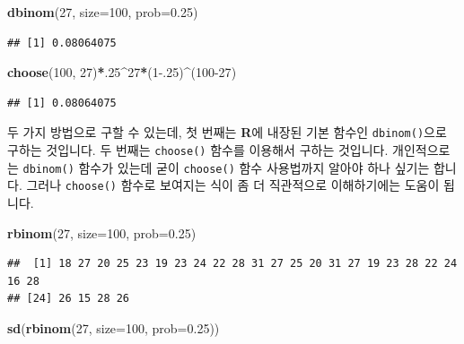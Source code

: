 \documentclass[]{book}
\newenvironment{Shaded}{\begin{snugshade}}{\end{snugshade}}
\newcommand{\DataTypeTok}[1]{\textcolor[rgb]{0.13,0.29,0.53}{#1}}
\newcommand{\DecValTok}[1]{\textcolor[rgb]{0.00,0.00,0.81}{#1}}
\newcommand{\FloatTok}[1]{\textcolor[rgb]{0.00,0.00,0.81}{#1}}
\newcommand{\KeywordTok}[1]{\textcolor[rgb]{0.13,0.29,0.53}{\textbf{#1}}}
\newcommand{\NormalTok}[1]{#1}
\newcommand{\OperatorTok}[1]{\textcolor[rgb]{0.81,0.36,0.00}{\textbf{#1}}}
\begin{document}
\begin{Shaded}
\begin{Highlighting}[]
\KeywordTok{dbinom}\NormalTok{(}\DecValTok{27}\NormalTok{, }\DataTypeTok{size=}\DecValTok{100}\NormalTok{, }\DataTypeTok{prob=}\FloatTok{0.25}\NormalTok{)}
\end{Highlighting}
\end{Shaded}

\begin{verbatim}
## [1] 0.08064075
\end{verbatim}

\begin{Shaded}
\begin{Highlighting}[]
\KeywordTok{choose}\NormalTok{(}\DecValTok{100}\NormalTok{, }\DecValTok{27}\NormalTok{)}\OperatorTok{*}\NormalTok{.}\DecValTok{25}\OperatorTok{^}\DecValTok{27}\OperatorTok{*}\NormalTok{(}\DecValTok{1}\FloatTok{-.25}\NormalTok{)}\OperatorTok{^}\NormalTok{(}\DecValTok{100-27}\NormalTok{)}
\end{Highlighting}
\end{Shaded}

\begin{verbatim}
## [1] 0.08064075
\end{verbatim}

두 가지 방법으로 구할 수 있는데, 첫 번째는 \textbf{R}에 내장된 기본 함수인 \texttt{dbinom()}으로 구하는 것입니다. 두 번째는 \texttt{choose()} 함수를 이용해서 구하는 것입니다. 개인적으로는 \texttt{dbinom()} 함수가 있는데 굳이 \texttt{choose()} 함수 사용법까지 알아야 하나 싶기는 합니다. 그러나 \texttt{choose()} 함수로 보여지는 식이 좀 더 직관적으로 이해하기에는 도움이 됩니다.

\begin{Shaded}
\begin{Highlighting}[]
\KeywordTok{rbinom}\NormalTok{(}\DecValTok{27}\NormalTok{, }\DataTypeTok{size=}\DecValTok{100}\NormalTok{, }\DataTypeTok{prob=}\FloatTok{0.25}\NormalTok{)}
\end{Highlighting}
\end{Shaded}

\begin{verbatim}
##  [1] 18 27 20 25 23 19 23 24 22 28 31 27 25 20 31 27 19 23 28 22 24 16 28
## [24] 26 15 28 26
\end{verbatim}

\begin{Shaded}
\begin{Highlighting}[]
\KeywordTok{sd}\NormalTok{(}\KeywordTok{rbinom}\NormalTok{(}\DecValTok{27}\NormalTok{, }\DataTypeTok{size=}\DecValTok{100}\NormalTok{, }\DataTypeTok{prob=}\FloatTok{0.25}\NormalTok{))}
\end{Highlighting}
\end{Shaded}
\end{document}
